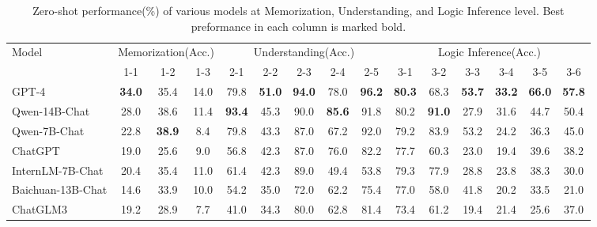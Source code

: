 \begin{table*}[t]
\scriptsize
\centering
\caption{Zero-shot performance(\%) of various models at Memorization, Understanding, and Logic Inference level. Best preformance in each column is marked bold. }
\begin{tabular}{l|ccc|ccccc|cccccc}
\hline
\multirow{2}{*}{Model} & \multicolumn{3}{c|}{Memorization(Acc.)} & \multicolumn{5}{c|}{Understanding(Acc.)} & \multicolumn{6}{c}{Logic Inference(Acc.)}     \\
                       & 1-1       & 1-2       & 1-3       & 2-1   & 2-2   & 2-3  & 2-4  & 2-5  & 3-1  & 3-2  & 3-3  & 3-4  & 3-5  & 3-6  \\ \hline
GPT-4               & \textbf{34.0} & 35.4          & 14.0          & 79.8          & \textbf{51.0} & \textbf{94.0} & 78.0          & \textbf{96.2} & \textbf{80.3} & 68.3          & \textbf{53.7} & \textbf{33.2} & \textbf{66.0} & \textbf{57.8} \\
Qwen-14B-Chat       & 28.0          & 38.6          & 11.4          & \textbf{93.4} & 45.3          & 90.0          & \textbf{85.6} & 91.8          & 80.2          & \textbf{91.0} & 27.9          & 31.6          & 44.7          & 50.4          \\
Qwen-7B-Chat        & 22.8          & \textbf{38.9} & 8.4           & 79.8          & 43.3          & 87.0          & 67.2          & 92.0          & 79.2          & 83.9          & 53.2          & 24.2          & 36.3          & 45.0          \\
ChatGPT             & 19.0          & 25.6          & 9.0           & 56.8          & 42.3          & 87.0          & 76.0          & 82.2          & 77.7          & 60.3          & 23.0          & 19.4          & 39.6          & 38.2          \\
InternLM-7B-Chat    & 20.4          & 35.4          & 11.0          & 61.4          & 42.3          & 89.0          & 49.4          & 53.8          & 79.3          & 77.9          & 28.8          & 23.8          & 38.3          & 30.0          \\
Baichuan-13B-Chat   & 14.6          & 33.9          & 10.0          & 54.2          & 35.0          & 72.0          & 62.2          & 75.4          & 77.0          & 58.0          & 41.8          & 20.2          & 33.5          & 21.0          \\
ChatGLM3            & 19.2          & 28.9          & 7.7           & 41.0          & 34.3          & 80.0          & 62.8          & 81.4          & 73.4          & 61.2          & 19.4          & 21.4          & 25.6          & 37.0          \\

\end{tabular}
\end{table*}
